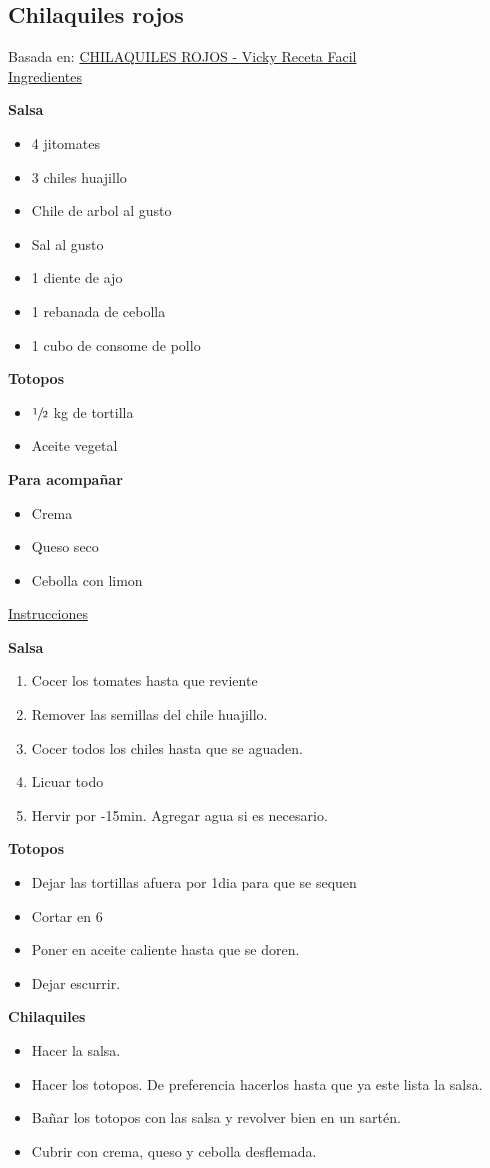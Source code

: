 \subsection{Chilaquiles rojos}\label{chilaquiles-rojos}

Basada en: \href{https://www.youtube.com/watch?v=I8xJOKFjDF4}{CHILAQUILES ROJOS - Vicky Receta Facil} \\

\underline{Ingredientes}

\textbf{Salsa}
\begin{itemize}
\item 4 jitomates
\item 3 chiles huajillo
\item Chile de arbol al gusto
\item Sal al gusto
\item 1 diente de ajo
\item 1 rebanada de cebolla
\item 1 cubo de consome de pollo
\end{itemize}

\textbf{Totopos}
\begin{itemize}
\item $\sfrac{1}{2}$ kg de tortilla
\item Aceite vegetal
\end{itemize}

\textbf{Para acompañar}
\begin{itemize}
\item Crema
\item Queso seco
\item Cebolla con limon
\end{itemize}

\underline{Instrucciones}

\textbf{Salsa}
\begin{enumerate}
\item Cocer los tomates hasta que reviente
\item Remover las semillas del chile huajillo. 
\item Cocer todos los chiles hasta que se aguaden.
\item Licuar todo
\item Hervir por -15min. Agregar agua si es necesario.
\end{enumerate}

\textbf{Totopos}
\begin{itemize}
\item Dejar las tortillas afuera por \Sim 1dia para que se sequen
\item Cortar en 6
\item Poner en aceite caliente hasta que se doren.
\item Dejar escurrir.
\end{itemize}

\textbf{Chilaquiles}
\begin{itemize}
\item Hacer la salsa.
\item Hacer los totopos. De preferencia hacerlos hasta que ya este lista la salsa.
\item Bañar los totopos con las salsa y revolver bien en un sartén.
\item Cubrir con crema, queso y cebolla desflemada. 
\end{itemize}

